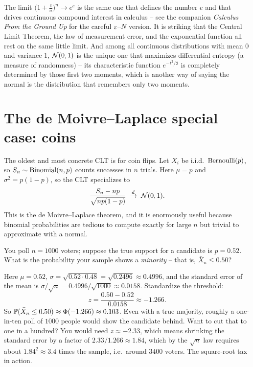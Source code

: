 \begin{connectionbox}
The limit $\big(1 + \frac{c}{n}\big)^n \to e^c$ is the same one that defines the number
$e$ and that drives continuous compound interest in calculus -- see the companion
\emph{Calculus From the Ground Up} for the careful $\eps$--$N$ version. It is striking
that the Central Limit Theorem, the law of measurement error, and the exponential
function all rest on the same little limit. And among all continuous distributions with
mean $0$ and variance $1$, $\Normal(0,1)$ is the unique one that maximizes differential
entropy (a measure of randomness) -- its characteristic function $e^{-t^2/2}$ is completely determined by those
first two moments, which is another way of saying the normal is the distribution that
remembers only two moments.
\end{connectionbox}

\section{The de Moivre--Laplace special case: coins}
\label{ch21:demoivre}

The oldest and most concrete CLT is for coin flips. Let $X_i$ be i.i.d.\ $\Bern(p)$, so
$S_n \sim \Bin(n, p)$ counts successes in $n$ trials. Here $\mu = p$ and
$\sigma^2 = p(1-p)$, so the CLT specializes to
\[
  \frac{S_n - np}{\sqrt{n p (1-p)}} \;\dto\; \Normal(0,1).
\]
This is the de Moivre--Laplace theorem, and it is enormously useful because binomial
probabilities are tedious to compute exactly for large $n$ but trivial to approximate
with a normal.

\begin{example}[A poll]
\label{ch21:ex-poll}
You poll $n = 1000$ voters; suppose the true support for a candidate is $p = 0.52$. What
is the probability your sample shows a \emph{minority} -- that is, $\bar X_n \le 0.50$?

Here $\mu = 0.52$, $\sigma = \sqrt{0.52 \cdot 0.48} = \sqrt{0.2496} \approx 0.4996$, and
the standard error of the mean is $\sigma/\sqrt n = 0.4996/\sqrt{1000} \approx 0.0158$.
Standardize the threshold:
\[
  z = \frac{0.50 - 0.52}{0.0158} \approx -1.266.
\]
So $\P(\bar X_n \le 0.50) \approx \Phi(-1.266) \approx 0.103$. Even with a true majority,
roughly a one-in-ten poll of $1000$ people would show the candidate behind. Want to cut
that to one in a hundred? You would need $z \approx -2.33$, which means shrinking the
standard error by a factor of $2.33/1.266 \approx 1.84$, which by the $\sqrt n$ law
requires about $1.84^2 \approx 3.4$ times the sample, i.e.\ around $3400$ voters. The
square-root tax in action.
\end{example}

